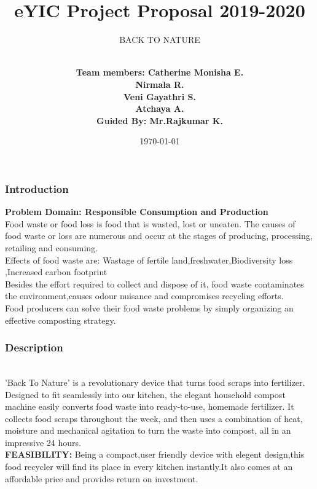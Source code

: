 \documentclass[11pt]{beamer}
\begin{document}
\author[{Team No-1086}]{
\\ \textbf{Team members:
	Catherine Monisha E.}\vspace{8pt}\\ \textbf{Nirmala R.}\vspace{8pt}
\\ \textbf{Veni Gayathri S.}\vspace{8pt}
\\ \textbf{Atchaya A.}\vspace{8pt}\\ \textbf{Guided By: Mr.Rajkumar K.}}
\title{eYIC Project Proposal 2019-2020}
\subtitle{BACK TO NATURE}
\date{\today}
\frame{\titlepage}
\begin{frame}
\frametitle{Introduction}
\textbf{Problem Domain: Responsible Consumption and Production}
\\ \textparagraph
Food waste or food loss is food that is wasted, lost or uneaten. 
 The causes of food waste or loss are numerous and occur at the stages of producing, processing, retailing and consuming.
\\ \textparagraph
Effects of food waste are:
Wastage of fertile land,freshwater,Biodiversity loss
,Increased carbon footprint
\\ \textparagraph
	 Besides the effort required to collect and dispose of it, food waste contaminates the environment,causes odour nuisance and compromises recycling efforts.
\\ \textparagraph
	Food producers can solve their food waste problems by simply organizing an effective composting strategy. 
\end{frame}
\begin{frame}
	\frametitle{Description}
\\ \textparagraph
'Back To Nature' is a revolutionary device that turns food scraps into fertilizer.
Designed to fit seamlessly into our kitchen, the elegant household compost machine easily converts food waste into ready-to-use, homemade fertilizer.
It collects food scraps throughout the week, and then uses a combination of heat, moisture and mechanical agitation to turn the waste into compost, all in an impressive 24 hours. 
\\ \textbf{FEASIBILITY:}
 \textparagraph 
Being a compact,user friendly device with elegent design,this food recycler will find its place in every kitchen instantly.It also comes at an affordable price and provides return on investment.
\end{frame}	
\end{document}

